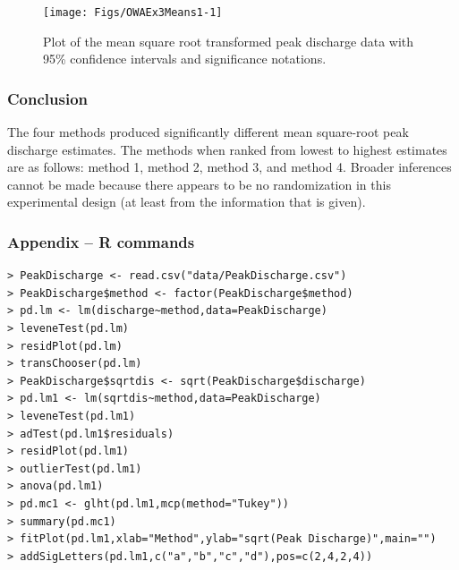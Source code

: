 \documentclass[10pt,openany]{book}\usepackage[]{graphicx}\usepackage[]{color}
\newenvironment{knitrout}{}{} %
\begin{document}
\begin{knitrout}
\color{fgcolor}\begin{figure}[hbtp]

{\centering \texttt{[image: Figs/OWAEx3Means1-1]} 

}

\caption[Plot of the mean square root transformed peak discharge data with 95\% confidence intervals and significance notations]{Plot of the mean square root transformed peak discharge data with 95\% confidence intervals and significance notations.}\label{fig:OWAEx3Means1}
\end{figure}


\end{knitrout}

\subsubsection*{Conclusion}
The four methods produced significantly different mean square-root peak discharge estimates.  The methods when ranked from lowest to highest estimates are as follows: method 1, method 2, method 3, and method 4.  Broader inferences cannot be made because there appears to be no randomization in this experimental design (at least from the information that is given).

\newpage
\subsubsection*{Appendix -- R commands}
\begin{Verbatim}[formatcom=\color{red},xleftmargin=5mm,commandchars=\\\{\}]
> PeakDischarge <- read.csv("data/PeakDischarge.csv")
> PeakDischarge$method <- factor(PeakDischarge$method)
> pd.lm <- lm(discharge~method,data=PeakDischarge)
> leveneTest(pd.lm)
> residPlot(pd.lm)
> transChooser(pd.lm)
> PeakDischarge$sqrtdis <- sqrt(PeakDischarge$discharge)
> pd.lm1 <- lm(sqrtdis~method,data=PeakDischarge)
> leveneTest(pd.lm1)
> adTest(pd.lm1$residuals)
> residPlot(pd.lm1)
> outlierTest(pd.lm1)
> anova(pd.lm1)
> pd.mc1 <- glht(pd.lm1,mcp(method="Tukey"))
> summary(pd.mc1)
> fitPlot(pd.lm1,xlab="Method",ylab="sqrt(Peak Discharge)",main="")
> addSigLetters(pd.lm1,c("a","b","c","d"),pos=c(2,4,2,4))
\end{Verbatim}


\end{document}
